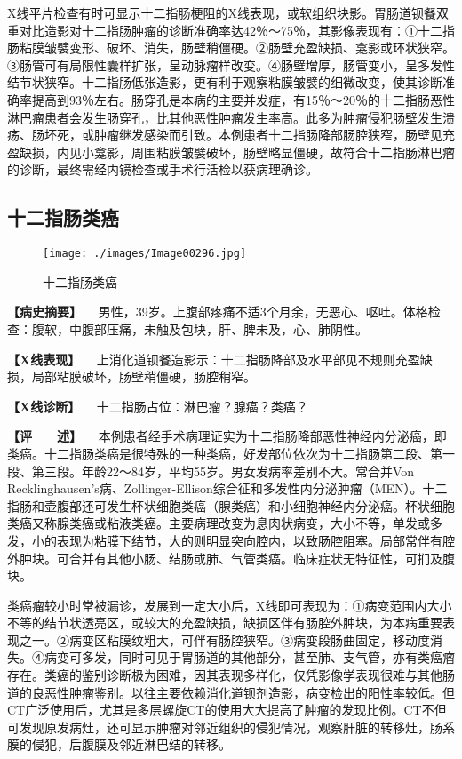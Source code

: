 X线平片检查有时可显示十二指肠梗阻的X线表现，或软组织块影。胃肠道钡餐双重对比造影对十二指肠肿瘤的诊断准确率达42％～75％，其影像表现有：①十二指肠粘膜皱襞变形、破坏、消失，肠壁稍僵硬。②肠壁充盈缺损、龛影或环状狭窄。③肠管可有局限性囊样扩张，呈动脉瘤样改变。④肠壁增厚，肠管变小，呈多发性结节状狭窄。十二指肠低张造影，更有利于观察粘膜皱襞的细微改变，使其诊断准确率提高到93％左右。肠穿孔是本病的主要并发症，有15％～20％的十二指肠恶性淋巴瘤患者会发生肠穿孔，比其他恶性肿瘤发生率高。此多为肿瘤侵犯肠壁发生溃疡、肠坏死，或肿瘤继发感染而引致。本例患者十二指肠降部肠腔狭窄，肠壁见充盈缺损，内见小龛影，周围粘膜皱襞破坏，肠壁略显僵硬，故符合十二指肠淋巴瘤的诊断，最终需经内镜检查或手术行活检以获病理确诊。

\subsection{十二指肠类癌}

\begin{figure}[!htbp]
 \centering
 \texttt{[image: ./images/Image00296.jpg]}
 \captionsetup{justification=centering}
 \caption{十二指肠类癌}
 \label{fig5-4-10}
  \end{figure} 

\textbf{【病史摘要】}
　男性，39岁。上腹部疼痛不适3个月余，无恶心、呕吐。体格检查：腹软，中腹部压痛，未触及包块，肝、脾未及，心、肺阴性。

\textbf{【X线表现】}
　上消化道钡餐造影示：十二指肠降部及水平部见不规则充盈缺损，局部粘膜破坏，肠壁稍僵硬，肠腔稍窄。

\textbf{【X线诊断】} 　十二指肠占位：淋巴瘤？腺癌？类癌？

\textbf{【评　　述】}
　本例患者经手术病理证实为十二指肠降部恶性神经内分泌癌，即类癌。十二指肠类癌是很特殊的一种类癌，好发部位依次为十二指肠第二段、第一段、第三段。年龄22～84岁，平均55岁。男女发病率差别不大。常合并Von
Recklinghausen's病、Zollinger-Ellison综合征和多发性内分泌肿瘤（MEN）。十二指肠和壶腹部还可发生杯状细胞类癌（腺类癌）和小细胞神经内分泌癌。杯状细胞类癌又称腺类癌或粘液类癌。主要病理改变为息肉状病变，大小不等，单发或多发，小的表现为粘膜下结节，大的则明显突向腔内，以致肠腔阻塞。局部常伴有腔外肿块。可合并有其他小肠、结肠或肺、气管类癌。临床症状无特征性，可扪及腹块。

类癌瘤较小时常被漏诊，发展到一定大小后，X线即可表现为：①病变范围内大小不等的结节状透亮区，或较大的充盈缺损，缺损区伴有肠腔外肿块，为本病重要表现之一。②病变区粘膜纹粗大，可伴有肠腔狭窄。③病变段肠曲固定，移动度消失。④病变可多发，同时可见于胃肠道的其他部分，甚至肺、支气管，亦有类癌瘤存在。类癌的鉴别诊断极为困难，因其表现多样化，仅凭影像学表现很难与其他肠道的良恶性肿瘤鉴别。以往主要依赖消化道钡剂造影，病变检出的阳性率较低。但CT广泛使用后，尤其是多层螺旋CT的使用大大提高了肿瘤的发现比例。CT不但可发现原发病灶，还可显示肿瘤对邻近组织的侵犯情况，观察肝脏的转移灶，肠系膜的侵犯，后腹膜及邻近淋巴结的转移。

